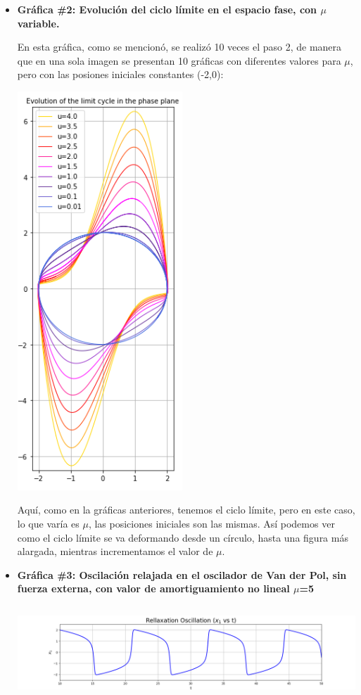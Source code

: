 \documentclass[12pt]{article}
\begin{document}
\begin{itemize}
\clearpage
\item\textbf{Gráfica \#2: Evolución del ciclo límite en el espacio fase, con $\mu$ variable.}

En esta gráfica, como se mencionó, se realizó 10 veces el paso 2, de manera que en una sola imagen se presentan 10 gráficas con diferentes valores para $\mu$, pero con las posiones iniciales constantes (-2,0):

\begin{center}
        \includegraphics[height=15cm]{Graf2.png}
\end{center}

Aquí, como en la gráficas anteriores, tenemos el ciclo límite, pero en este caso, lo que varía es $\mu$, las posiciones iniciales son las mismas. Así podemos ver como el ciclo límite se va deformando desde un círculo, hasta una figura más alargada, mientras incrementamos el valor de $\mu$.

\clearpage
\item \textbf{Gráfica \#3: Oscilación relajada en el oscilador de Van der Pol, sin fuerza externa, con valor de amortiguamiento no lineal $\mu$=5}

\begin{center}
        \includegraphics[height=3.5cm]{Graf3.png}
\end{center}


\end{itemize}
\end{document}
